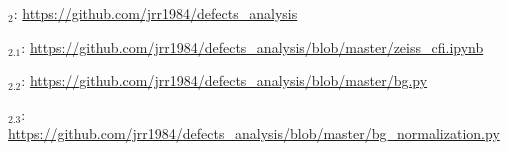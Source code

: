 \singlespacing
{}
\label{chap:gitrefs}



\faGithub$_{2}$: \href{https://github.com/jrr1984/defects\_analysis}{https://github.com/jrr1984/defects\_analysis}

\faGithub$_{2.1}$: \href{https://github.com/jrr1984/defects\_analysis/blob/master/zeiss\_cfi.ipynb}{https://github.com/jrr1984/defects\_analysis/blob/master/zeiss\_cfi.ipynb}

\faGithub$_{2.2}$: \href{https://github.com/jrr1984/defects\_analysis/blob/master/bg.py}{https://github.com/jrr1984/defects\_analysis/blob/master/bg.py}

\faGithub$_{2.3}$: \href{https://github.com/jrr1984/defects\_analysis/blob/master/bg\_normalization.py}{https://github.com/jrr1984/defects\_analysis/blob/master/bg\_normalization.py}
